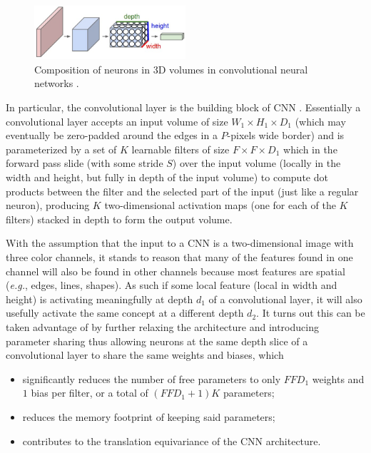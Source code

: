 \begin{figure}[ht]
    \centering
    \includegraphics[width=0.5\textwidth]{figs/3dvolumes.png}
    \caption{Composition of neurons in 3D volumes in convolutional neural networks \cite{cs231n}.}
    \label{fig:3dvolumes}
\end{figure}

In particular, the convolutional layer is the building block of \ac{CNN} \cite{cs231n} \cite{deeplearning}. Essentially a convolutional layer accepts an input volume of size $W_1 \times H_1 \times D_1$ (which may eventually be zero-padded around the edges in a $P$-pixels wide border) and is parameterized by a set of $K$ learnable filters of size $F \times F \times D_1$ which in the forward pass slide (with some stride $S$) over the input volume (locally in the width and height, but fully in depth of the input volume) to compute dot products between the filter and the selected part of the input (just like a regular neuron), producing $K$ two-dimensional activation maps (one for each of the $K$ filters) stacked in depth to form the output volume.

With the assumption that the input to a \ac{CNN} is a two-dimensional image with three color channels, it stands to reason that many of the features found in one channel will also be found in other channels because most features are spatial (\textit{e.g.}, edges, lines, shapes). As such if some local feature (local in width and height) is activating meaningfully at depth $d_1$ of a convolutional layer, it will also usefully activate the same concept at a different depth $d_2$. It turns out this can be taken advantage of by further relaxing the architecture and introducing parameter sharing thus allowing neurons at the same depth slice of a convolutional layer to share the same weights and biases, which

\begin{itemize}
    \item significantly reduces the number of free parameters to only $F F D_1$ weights and $1$ bias per filter, or a total of $(F F D_1 + 1) K$ parameters;
    \item reduces the memory footprint of keeping said parameters;
    \item contributes to the translation equivariance of the \ac{CNN} architecture.
\end{itemize}

